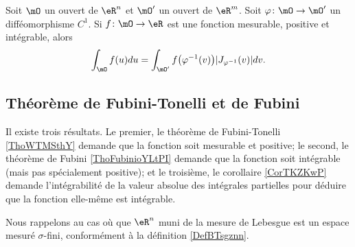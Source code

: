 \begin{theorem} \label{ThomFeRCi}
    Soit \( \mO\) un ouvert de \( \eR^n\) et \( \mO'\) un ouvert de \( \eR^m\). Soit \( \varphi\colon \mO\to \mO'\) un difféomorphisme \( C^1\). Si \( f\colon \mO\to \eR\) est une fonction mesurable, positive et intégrable, alors
    \begin{equation}
        \int_{\mO}f(u)du=\int_{\mO'}f\big( \varphi^{-1}(v) \big)| J_{\varphi^{-1}}(v) |dv.
    \end{equation}
\end{theorem}

\subsection{Théorème de Fubini-Tonelli et de Fubini}

Il existe trois résultats. Le premier, le théorème de Fubini-Tonelli \ref{ThoWTMSthY} demande que la fonction soit mesurable et positive; le second, le théorème de Fubini \ref{ThoFubinioYLtPI} demande que la fonction soit intégrable (mais pas spécialement positive); et le troisième, le corollaire \ref{CorTKZKwP} demande l'intégrabilité de la valeur absolue des intégrales partielles pour déduire que la fonction elle-même est intégrable.


Nous rappelons au cas où que \( \eR^n\) muni de la mesure de Lebesgue est un espace mesuré \( \sigma\)-fini, conformément à la définition \ref{DefBTsgznn}.

